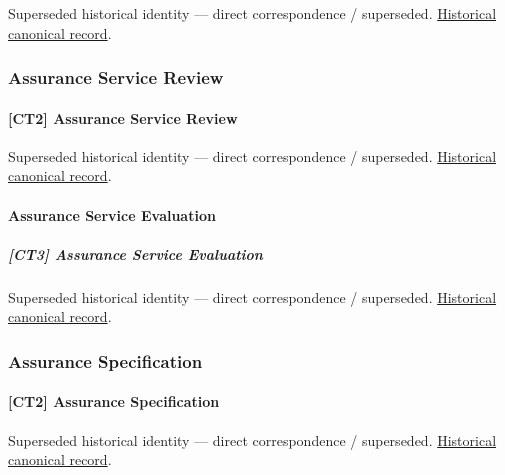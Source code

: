\par\label{element:88bf57b7a92c4c1da1b5f0a67d3ebd82}
Superseded historical identity — direct correspondence / superseded. \href{../../../../continuum/strategy/capability/88bf57b7a92c4c1da1b5f0a67d3ebd82.md}{Historical canonical record}.\par

\subsubsection{Assurance Service Review}

\paragraph{[CT2] Assurance Service Review}

\par\label{element:b345cb12b45746409302899514126170}
Superseded historical identity — direct correspondence / superseded. \href{../../../../continuum/strategy/capability/b345cb12b45746409302899514126170.md}{Historical canonical record}.\par

\paragraph{Assurance Service Evaluation}

\subparagraph{[CT3] Assurance Service Evaluation}

\par\label{element:be34b54314c6444f8418d645f6c83b6d}
Superseded historical identity — direct correspondence / superseded. \href{../../../../continuum/strategy/capability/be34b54314c6444f8418d645f6c83b6d.md}{Historical canonical record}.\par

\subsubsection{Assurance Specification}

\paragraph{[CT2] Assurance Specification}

\par\label{element:8006ee0dd95f4d7fb1f408fa09b6ce19}
Superseded historical identity — direct correspondence / superseded. \href{../../../../continuum/strategy/capability/8006ee0dd95f4d7fb1f408fa09b6ce19.md}{Historical canonical record}.\par

